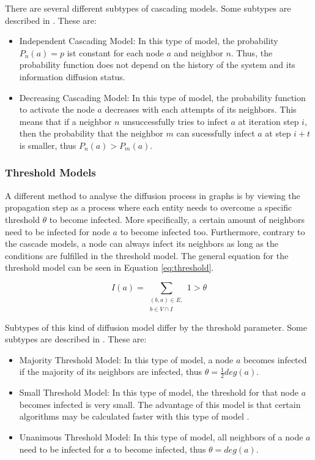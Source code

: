 There are several different subtypes of cascading models.
Some subtypes are described in \cite{diffusionbasics}. These are:

\begin{itemize}
    \item Independent Cascading Model: In this type of model, the 
    probability $P_n(a)=p$ ist constant for each node $a$ and neighbor $n$.
    Thus, the probability function does not depend on the history 
    of the system and its information diffusion status.
    \item Decreasing Cascading Model: In this type of model, the probability
    function to activate the node $a$ decreases with each attempts of its 
    neighbors. This means that if a neighbor $n$ unsuccessfully tries to infect
    $a$ at iteration step $i$, then the probability that the neighbor $m$
    can sucessfully infect $a$ at step $i+t$ is smaller, thus $P_n(a)>P_m(a)$.
\end{itemize}

\subsubsection{Threshold Models}
A different method to analyse the diffusion process in graphs is by viewing the
propagation step as a process where each entity needs to overcome a 
specific threshold $\theta$ to become infected. More specifically, 
a certain amount of neighbors need to be infected for node $a$ to become 
infected too. Furthermore, contrary to the cascade models, a node can always 
infect its neighbors as long as the conditions are fulfilled in the threshold 
model. The general equation for the threshold model can be seen in Equation
\ref{eq:threshold}.

\begin{equation}
    I(a) = \sum\limits_{\substack{(b,a)\in E, \\ b \in V \cap I}}
    1 > \theta    
    \label{eq:threshold}
\end{equation}

Subtypes of this kind of diffusion model differ by the threshold parameter.
Some subtypes are described in \cite{diffusionbasics}. These are:

\begin{itemize}
    \item Majority Threshold Model: In this type of model, a node $a$ becomes
    infected if the majority of its neighbors are infected, thus 
    $\theta = \frac{1}{2}deg(a)$.
    \item Small Threshold Model: In this type of model, the threshold for that
    node $a$ becomes infected is very small. The advantage of this model is that 
    certain algorithms may be calculated faster with this type of model 
    \cite{diffusionbasics}.
    \item Unanimous Threshold Model: In this type of model, all neighbors 
    of a node $a$ need to be infected for $a$ to become infected, thus
    $\theta = deg(a)$.
\end{itemize}


